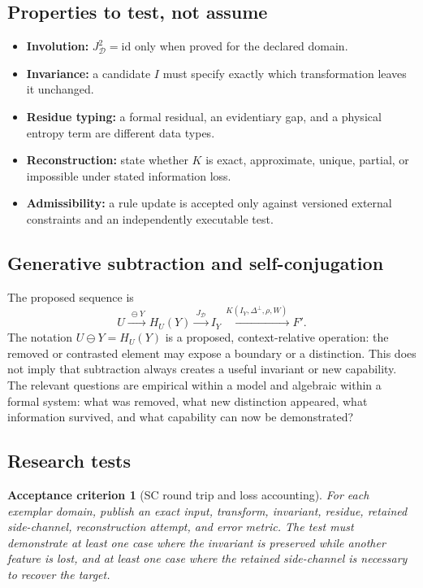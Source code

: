 \documentclass[11pt,oneside]{article}
\newtheorem{criterion}{Acceptance criterion}[section]
\begin{document}
\subsection{Properties to test, not assume}
\begin{itemize}
  \item \textbf{Involution:} $J_{\mathcal D}^2=\mathrm{id}$ only when proved for the declared domain.
  \item \textbf{Invariance:} a candidate $I$ must specify exactly which transformation leaves it unchanged.
  \item \textbf{Residue typing:} a formal residual, an evidentiary gap, and a physical entropy term are different data types.
  \item \textbf{Reconstruction:} state whether $K$ is exact, approximate, unique, partial, or impossible under stated information loss.
  \item \textbf{Admissibility:} a rule update is accepted only against versioned external constraints and an independently executable test.
\end{itemize}

\subsection{Generative subtraction and self-conjugation}
The proposed sequence is
\[
U\xrightarrow{\ \ominus Y\ }H_U(Y)\xrightarrow{\ J_{\mathcal D}\ }I_Y\xrightarrow{\ K(I_Y,\Delta^{\perp},\rho, W)\ }F'.
\]
The notation $U\ominus Y=H_U(Y)$ is a proposed, context-relative operation: the removed or contrasted element may expose a boundary or a distinction. This does not imply that subtraction always creates a useful invariant or new capability. The relevant questions are empirical within a model and algebraic within a formal system: what was removed, what new distinction appeared, what information survived, and what capability can now be demonstrated?

\subsection{Research tests}
\begin{criterion}[SC round trip and loss accounting]
For each exemplar domain, publish an exact input, transform, invariant, residue, retained side-channel, reconstruction attempt, and error metric. The test must demonstrate at least one case where the invariant is preserved while another feature is lost, and at least one case where the retained side-channel is necessary to recover the target.
\end{criterion}
\end{document}
